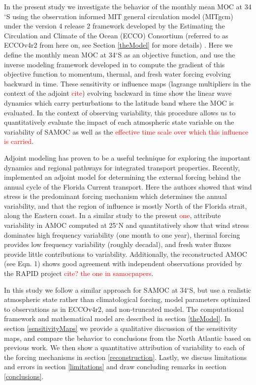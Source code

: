 \documentclass[a4paper,11pt]{article}
\newcommand{\red}[1]{\textcolor{red}{#1}}
\begin{document}
	In the present study we investigate the behavior of the monthly mean MOC at 34$^{\circ}$S using the observation informed MIT general circulation model (MITgcm) under the version 4 release 2 framework developed by the Estimating the Circulation and Climate of the Ocean (ECCO) Consortium (referred to as ECCOv4r2 from here on, see Section \ref{theModel} for more details) \cite{forgetECCOv4}. Here we define the monthly mean MOC at 34$^{\circ}$S as an objective function, and use the inverse modeling framework developed in \cite{forgetECCOv4} to compute the gradient of this objective function to momentum, thermal, and fresh water forcing evolving backward in time. These sensitivity or influence maps (lagrange multipliers in the context of the adjoint \red{cite}) evolving backward in time show the linear wave dynamics which carry perturbations to the latitude band where the MOC is evaluated. In the context of observing variability, this procedure allows us to quantitatively evaluate the impact of each atmospheric state variable on the variability of SAMOC as well as the \red{effective time scale over which this influence is carried}.  

	Adjoint modeling has proven to be a useful technique for exploring the important dynamics and regional pathways for integrated transport properties. Recently, \cite{czeschelFlorida} implemented an adjoint model for determining the external forcing behind the annual cycle of the Florida Current transport. Here the authors showed that wind stress is the predominant forcing mechanism which determines the annual variability, and that the region of influence is mostly North of the Florida strait, along the Eastern coast. In a similar study to the present \red{one}, \cite{pillarAttribution} attribute variability in AMOC computed at 25$^{\circ}$N and quantitatively show that wind stress dominates high frequency variability (one month to one year), thermal forcing provides low frequency variability (roughly decadal), and fresh water fluxes provide little contributions to variability. Additionally, the reconstructed AMOC (see \cite{pillarAttribution} Eqn. 1) shows good agreement with independent observations provided by the RAPID project \cite{mccarthyAmoc}\red{cite? the one in samocpapers}. 

	In this study we follow a similar approach for SAMOC at 34$^{\circ}$S, but use a realistic atmospheric state rather than climatological forcing, model parameters optimized to observations as in ECCOv4r2, and non-truncated model. The computational framework and mathematical model are described in section \ref{theModel}. In section \ref{sensitivityMaps} we provide a qualitative discussion of the sensitivity maps, and compare the behavior to conclusions from the North Atlantic based on previous work. We then show a quantitative attribution of variability to each of the forcing mechanisms in section \ref{reconstruction}. Lastly, we discuss limitations and errors in section \ref{limitations} and draw concluding remarks in section \ref{conclusions}.
\end{document}
